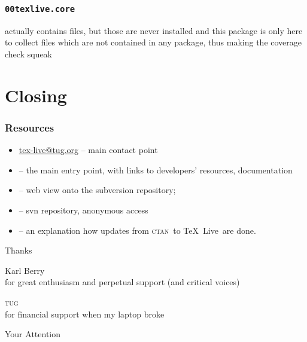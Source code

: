 \documentclass{beamer}
\newcommand{\tl}{\TeX~Live}
\newcommand{\acro}[1]{\textsc{\MakeLowercase{#1}}}
\newcommand{\ctan}{\acro{CTAN}}
\begin{document}
\begin{frame}
  \frametitle{\texttt{00texlive.core}}
  actually contains files, but those are
  never installed and this package is only here to collect files
  which are not contained in any package, thus making the coverage
  check squeak
\end{frame}


\section{Closing}


\begin{frame}
  \frametitle{Resources}
  \begin{itemize}
    \item \url{tex-live@tug.org} -- main contact point
  \item {} -- the main entry point, with
  links to developers' resources, documentation
\item {} -- web view onto the
  subversion repository;
\item {} -- svn repository, anonymous
  access
\item {} -- an
  explanation how updates from \ctan\ to \tl\ are done.
  \end{itemize}
\end{frame}

\begin{frame}
  \begin{center}
    {\Large Thanks}

    \bigskip
    Karl Berry\\
    {\small for great enthusiasm and  perpetual
      support (and critical voices)}
    
    \pause
    \bigskip
    \acro{TUG}\\%
    {\small for financial support when my laptop broke}
    
    \pause
    \bigskip
    Your Attention
  \end{center}
\end{frame}
\end{document}
